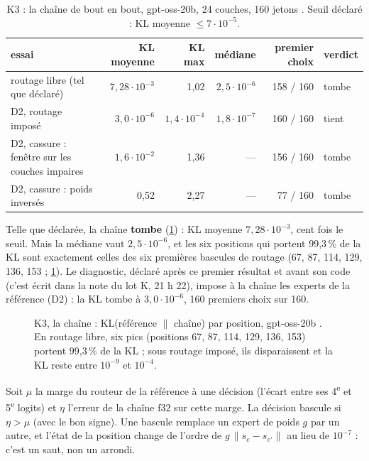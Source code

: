 \begin{table}[!htbp]
\centering\small
\caption[K3 : la chaîne de bout en bout]{K3 : la chaîne de bout en bout, gpt-oss-20b, 24 couches, 160 jetons \mes. Seuil déclaré : KL moyenne $\le 7\cdot10^{-5}$.}
\label{tab:t2n-chaine}
\footnotesize
\begin{tabular}{@{}lrrrrl@{}}
\toprule
essai & KL moyenne & KL max & médiane & premier choix & verdict \\
\midrule
routage libre (tel que déclaré) & $7{,}28\cdot10^{-3}$ & 1,02 & $2{,}5\cdot10^{-6}$ & 158 / 160 & tombe \\
D2, routage imposé & $3{,}0\cdot10^{-6}$ & $1{,}4\cdot10^{-4}$ & $1{,}8\cdot10^{-7}$ & 160 / 160 & tient \\
D2, cassure : fenêtre sur les couches impaires & $1{,}6\cdot10^{-2}$ & 1,36 & — & 156 / 160 & tombe \\
D2, cassure : poids inversés & 0,52 & 2,27 & — & 77 / 160 & tombe \\
\bottomrule
\end{tabular}
\end{table}

Telle que déclarée, la chaîne \textbf{tombe} (\cref{tab:t2n-chaine}) : KL moyenne $7{,}28\cdot10^{-3}$, cent fois le seuil. Mais la médiane vaut $2{,}5\cdot10^{-6}$, et les six positions qui portent 99,3\,\% de la KL sont exactement celles des six premières bascules de routage (67, 87, 114, 129, 136, 153 ; \cref{fig:t2n-chaine}). Le diagnostic, déclaré après ce premier résultat et avant son code (c'est écrit dans la note du lot K, 21 h 22), impose à la chaîne les experts de la référence (D2) : la KL tombe à $3{,}0\cdot10^{-6}$, 160 premiers choix sur 160.

\begin{figure}[!htbp]
\centering
\GrapheNoyChaine
\caption[K3 : KL par position, routage libre contre imposé]{K3, la chaîne : KL(référence $\|$ chaîne) par position, gpt-oss-20b \mes. En routage libre, six pics (positions 67, 87, 114, 129, 136, 153) portent 99,3\,\% de la KL ; sous routage imposé, ils disparaissent et la KL reste entre $10^{-9}$ et $10^{-4}$.}
\label{fig:t2n-chaine}
\end{figure}

\begin{proposition}\label{prop:t2n-bascule}
Soit $\mu$ la marge du routeur de la référence à une décision (l'écart entre ses 4\textsuperscript{e} et 5\textsuperscript{e} logits) et $\eta$ l'erreur de la chaîne f32 sur cette marge. La décision bascule si $\eta > \mu$ (avec le bon signe). Une bascule remplace un expert de poids $g$ par un autre, et l'état de la position change de l'ordre de $g\,\|s_e - s_{e'}\|$ au lieu de $10^{-7}$ : c'est un saut, non un arrondi.
\end{proposition}

